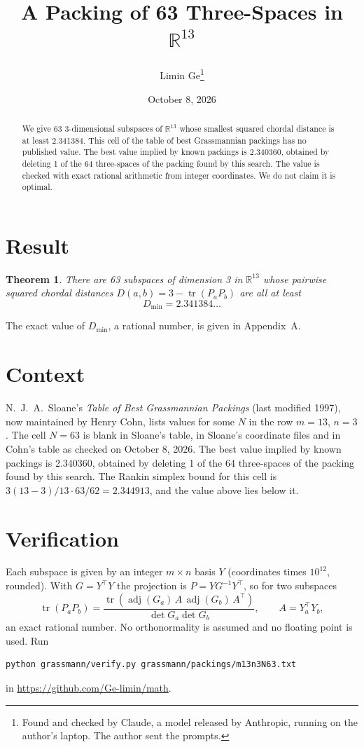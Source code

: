 \documentclass[11pt,a4paper]{article}
\title{A Packing of 63 Three-Spaces in $\mathbb{R}^{13}$}
\author{Limin Ge\thanks{Found and checked by Claude, a model released by Anthropic, running on the author's laptop. The author sent the prompts.}}
\date{October 8, 2026}
\newtheorem*{theorem}{Theorem}
\begin{document}
\maketitle
\begin{abstract}
We give 63 3-dimensional subspaces of $\mathbb{R}^{13}$ whose smallest squared chordal distance is at least 2.341384. This cell of the table of best Grassmannian packings has no published value. The best value implied by known packings is 2.340360, obtained by deleting 1 of the 64 three-spaces of the packing found by this search. The value is checked with exact rational arithmetic from integer coordinates. We do not claim it is optimal.
\end{abstract}

\section{Result}
\begin{theorem}
There are 63 subspaces of dimension 3 in $\mathbb{R}^{13}$ whose pairwise squared chordal distances $D(a,b) = 3 - \operatorname{tr}(P_aP_b)$ are all at least
\[ D_{\min} = 2.341384\ldots \]
\end{theorem}
The exact value of $D_{\min}$, a rational number, is given in Appendix~A.


\section{Context}
N.~J.~A.~Sloane's \emph{Table of Best Grassmannian Packings} (last modified 1997), now maintained by Henry Cohn, lists values for some $N$ in the row $m=13$, $n=3$. The cell $N=63$ is blank in Sloane's table, in Sloane's coordinate files and in Cohn's table as checked on October 8, 2026. The best value implied by known packings is 2.340360, obtained by deleting 1 of the 64 three-spaces of the packing found by this search. The Rankin simplex bound for this cell is $3(13-3)/13\cdot 63/62 = 2.344913$, and the value above lies below it.


\section{Verification}
Each subspace is given by an integer $m\times n$ basis $Y$ (coordinates times $10^{12}$, rounded). With $G=Y^\top Y$ the projection is $P=YG^{-1}Y^\top$, so for two subspaces
\[ \operatorname{tr}(P_aP_b)=\frac{\operatorname{tr}(\operatorname{adj}(G_a)\,A\,\operatorname{adj}(G_b)\,A^\top)}{\det G_a\det G_b},\qquad A=Y_a^\top Y_b, \]
an exact rational number. No orthonormality is assumed and no floating point is used. Run
\begin{verbatim}
python grassmann/verify.py grassmann/packings/m13n3N63.txt
\end{verbatim}
in \url{https://github.com/Ge-limin/math}.
\end{document}
